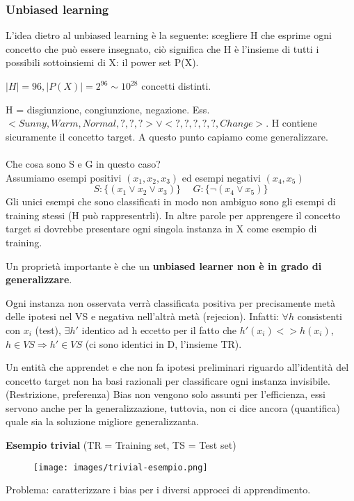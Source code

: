 \subsubsection{Unbiased learning}
L'idea dietro al unbiased learning è la seguente: scegliere H che esprime ogni concetto che può
essere insegnato, ciò significa che H è l'insieme di tutti i possibili sottoinsiemi di X: il power set P(X).
\begin{example}
    $|H| = 96, |P(X)| = 2^{96} \sim 10^{28}$ concetti distinti.
\end{example}
\hspace{-15pt}H = disgiunzione, congiunzione, negazione. Ess. $<Sunny, Warm, Normal, ?, ?, ?> \lor <?, ?, ?, ?, ?, Change>$.
H contiene sicuramente il concetto target. A questo punto capiamo come generalizzare.\\\\
Che cosa sono S e G in questo caso?\\
Assumiamo esempi positivi $(x_1, x_2, x_3)$ ed esempi negativi $(x_4, x_5)$
$$S: \{(x_1 \lor x_2 \lor x_3)\} \hspace{15pt} G: \{\lnot (x_4 \lor x_5)\}$$
Gli unici esempi che sono classificati in modo non ambiguo sono gli esempi di training stessi (H può rappresentrli). In altre parole
per apprengere il concetto target si dovrebbe presentare ogni singola instanza in X come esempio di training.
\begin{definition}
    Un proprietà importante è che un \textbf{unbiased learner non è in grado di generalizzare}.
\end{definition}
\begin{demostration}
    Ogni instanza non osservata verrà classificata positiva per precisamente metà delle ipotesi nel VS e negativa nell'altrà metà (rejecion).
    Infatti: $\forall h$ consistenti con $x_i$ (test), $\exists h'$ identico ad h eccetto per il fatto che $h'(x_i) <> h(x_i)$, $h\in VS \Rightarrow h' \in VS$ (ci sono identici in D, l'insieme TR).
\end{demostration}
\hspace{-15pt}Un entità che apprendet e che non fa ipotesi preliminari riguardo all'identità del concetto target non ha basi
razionali per classificare ogni instanza invisibile. (Restrizione, preferenza) Bias non vengono solo assunti per l'efficienza, 
essi servono anche per la generalizzazione, tuttovia, non ci dice ancora (quantifica) quale sia la soluzione migliore generalizzanta.
\begin{example}
    \textbf{Esempio trivial} (TR = Training set, TS = Test set)
    \begin{figure}[h!]
        \centering
        \texttt{[image: images/trivial-esempio.png]}
    \end{figure}
\end{example}
\hspace{-15pt}Problema: caratterizzare i bias per i diversi approcci di apprendimento.
